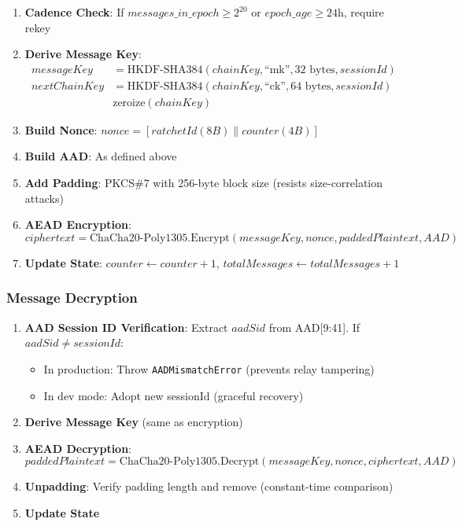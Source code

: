 \documentclass[11pt,a4paper,oneside]{article}
\begin{document}
\begin{enumerate}
\item \textbf{Cadence Check}: If $messages\_in\_epoch \geq 2^{20}$ or $epoch\_age \geq 24\text{h}$, require rekey

\item \textbf{Derive Message Key}:
\begin{align*}
messageKey &= \text{HKDF-SHA384}(chainKey, \text{``mk''}, 32\text{ bytes}, sessionId) \\
nextChainKey &= \text{HKDF-SHA384}(chainKey, \text{``ck''}, 64\text{ bytes}, sessionId) \\
&\text{zeroize}(chainKey)
\end{align*}

\item \textbf{Build Nonce}: $nonce = [ratchetId(8B) \| counter(4B)]$

\item \textbf{Build AAD}: As defined above

\item \textbf{Add Padding}: PKCS\#7 with 256-byte block size (resists size-correlation attacks)

\item \textbf{AEAD Encryption}:
\begin{equation}
ciphertext = \text{ChaCha20-Poly1305.Encrypt}(messageKey, nonce, paddedPlaintext, AAD)
\end{equation}

\item \textbf{Update State}: $counter \leftarrow counter + 1$, $totalMessages \leftarrow totalMessages + 1$
\end{enumerate}

\subsubsection{Message Decryption}

\begin{enumerate}
\item \textbf{AAD Session ID Verification}:
Extract $aadSid$ from AAD[9:41]. If $aadSid \neq sessionId$:
\begin{itemize}
\item In production: Throw \texttt{AADMismatchError} (prevents relay tampering)
\item In dev mode: Adopt new sessionId (graceful recovery)
\end{itemize}

\item \textbf{Derive Message Key} (same as encryption)

\item \textbf{AEAD Decryption}:
\begin{equation}
paddedPlaintext = \text{ChaCha20-Poly1305.Decrypt}(messageKey, nonce, ciphertext, AAD)
\end{equation}

\item \textbf{Unpadding}: Verify padding length and remove (constant-time comparison)

\item \textbf{Update State}
\end{enumerate}
\end{document}
